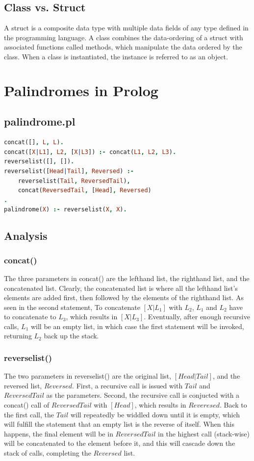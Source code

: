 \documentclass[12pt]{article}
\begin{document}
	\subsection{Class vs. Struct}
	A struct is a composite data type with multiple data fields of any type defined in the programming language. A class combines the data-ordering of a struct with associated functions called methods, which manipulate the data ordered by the class. When a class is instantiated, the instance is referred to as an object.
	\pagebreak

	\section{Palindromes in Prolog}
	\subsection{palindrome.pl}
	\begin{lstlisting}[language = Prolog, tabsize = 8]
concat([], L, L).
concat([X|L1], L2, [X|L3]) :- concat(L1, L2, L3).
reverselist([], []).
reverselist([Head|Tail], Reversed) :-
	reverselist(Tail, ReversedTail),
	concat(ReversedTail, [Head], Reversed)
.
palindrome(X) :- reverselist(X, X).
	\end{lstlisting}
	\subsection{Analysis}
	\subsubsection{concat()}
	The three parameters in concat() are the lefthand list, the righthand list, and the concatenated list. Clearly, the concatenated list is where all the lefthand list's elements are added first, then followed by the elements of the righthand list. As seen in the second statement, To concatenate $[X|L_1]$ with $L_2$, $L_1$ and $L_2$ have to concatenate to $L_3$, which results in $[X|L_3]$. Eventually, after enough recursive calls, $L_1$ will be an empty list, in which case the first statement will be invoked, returning $L_2$ back up the stack.

	\subsubsection{reverselist()}
	The two parameters in reverselist() are the original list, $[Head|Tail]$, and the reversed list, $Reversed$. First, a recursive call is issued with $Tail$ and $ReversedTail$ as the parameters. Second, the recursive call is conjucted with a concat() call of $ReversedTail$ with $[Head]$, which results in $Reveresed$. Back to the first call, the $Tail$ will repeatedly be widdled down until it is empty, which will fulfill the statement that an empty list is the reverse of itself. When this happens, the final element will be in $ReversedTail$ in the highest call (stack-wise) will be concatenated to the element before it, and this will cascade down the stack of calls, completing the $Reversed$ list.
\end{document}
